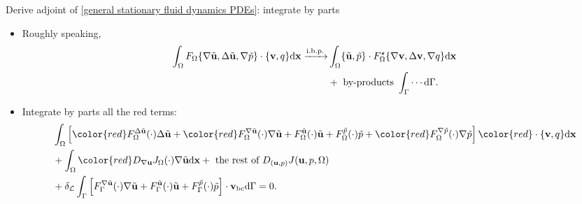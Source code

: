 \documentclass[10pt
hyperref={
    pdfauthor={Hong Quan Ba Nguyen},
    pdftitle={Optimal Shape Design of Air Ducts in Combustion Engines: Design a General Framework},
    pdfsubject={Talk},
    pdfcreator={LaTeX},
}
]{beamer}
\begin{document}
\begin{frame}{Derive adjoint of \eqref{general stationary fluid dynamics PDEs}: integrate by parts}
    \begin{itemize}
        \item Roughly speaking,
        \begin{align*}
            \int_\Omega F_\Omega\{\nabla\tilde{\textbf{u}},\Delta\tilde{\textbf{u}},\nabla\tilde{p}\}\cdot\{\textbf{v},q\}{\rm d}\textbf{x}\xrightarrow{\rm i.b.p.}&\int_\Omega \{\tilde{\textbf{u}},\tilde{p}\}\cdot F_\Omega^\star\{\nabla\textbf{v},\Delta\textbf{v},\nabla q\}{\rm d}\textbf{x}\\
            &+ \mbox{ by-products } \int_\Gamma \cdots{\rm d}\Gamma.
        \end{align*}
        \item Integrate by parts all the red terms:
        \begin{align*}
            &\int_\Omega \left[{\color{red}F_\Omega^{\Delta\tilde{\textbf{u}}}(\cdot)\Delta\tilde{\textbf{u}}} + {\color{red}F_\Omega^{\nabla\tilde{\textbf{u}}}(\cdot)\nabla\tilde{\textbf{u}}} + F_\Omega^{\tilde{\textbf{u}}}(\cdot)\tilde{\textbf{u}} + F_\Omega^{\tilde{p}}(\cdot)\tilde{p} + {\color{red}F_\Omega^{\nabla\tilde{p}}(\cdot)\nabla\tilde{p}}\right]{\color{red}\cdot\{\textbf{v},q\}}{\rm d}\textbf{x}\\
            &+ \int_\Omega {\color{red}D_{\nabla\textbf{u}}J_\Omega(\cdot)\nabla\tilde{\textbf{u}}}{\rm d}\textbf{x} + \mbox{ the rest of } D_{(\textbf{u},p)}J(\textbf{u},p,\Omega)\\
            &+ \delta_{\mathcal{L}}\int_\Gamma \left[F_\Gamma^{\nabla\tilde{\textbf{u}}}(\cdot)\nabla\tilde{\textbf{u}} + F_\Gamma^{\tilde{\textbf{u}}}(\cdot)\tilde{\textbf{u}} + F_\Gamma^{\tilde{p}}(\cdot)\tilde{p}\right]\cdot\textbf{v}_{\rm bc}{\rm d}\Gamma = 0.
        \end{align*}
    \end{itemize}
\end{frame}
\end{document}
